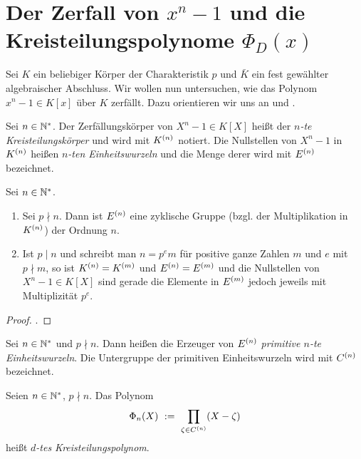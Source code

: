 \chapter{Der Zerfall von $x^n-1$ und die Kreisteilungspolynome $\Phi_D(x)$}
\label{chap:kreisteilungspolynome}

Sei $K$ ein beliebiger Körper der Charakteristik $p$ 
und $\bar K$ ein fest gewählter algebraischer
Abschluss. Wir wollen nun untersuchen, wie das Polynom
$x^n-1 \in K[x]$ über $K$ zerfällt. Dazu orientieren wir uns 
an \autocite{lidl1997finite} und \autocite{wan2003lectures}.

\begin{definition}
  Sei $n\in\mathbb{N}^\ast$. Der Zerfällungskörper von $X^n-1 \in K[X]$ heißt
  der \emph{$n$-te Kreisteilungskörper} und wird mit $K^{(n)}$ notiert.
  Die Nullstellen von $X^n-1$ in $K^{(n)}$ heißen \emph{$n$-ten
  Einheitswurzeln} und die Menge derer wird mit $E^{(n)}$ bezeichnet.
\end{definition}


\begin{satz}
  Sei $n\in \mathbb{N}^\ast$.
  \begin{enumerate}
    \item Sei $p\nmid n$. Dann ist $E^{(n)}$ eine zyklische Gruppe (bzgl. der
      Multiplikation in $K^{(n)}$) der Ordnung $n$.
    \item Ist $p \mid n$ und schreibt man $n = p^e m$ 
      für positive ganze Zahlen $m$ und $e$ mit $p\nmid m$, so
      ist $K^{(n)} = K^{(m)}$ und $E^{(n)}= E^{(m)}$ und die Nullstellen von
      $X^n-1 \in K[X]$ sind gerade die Elemente in $E^{(m)}$ jedoch jeweils mit
      Multiplizität $p^e$.
  \end{enumerate}
\end{satz}
\begin{proof}
  \autocite[Theorem 2.42]{lidl1997finite}.
\end{proof}


\begin{definition}
  Sei $n\in \mathbb{N}^\ast$ und $p\nmid n$. Dann heißen die Erzeuger von 
  $E^{(n)}$ \emph{primitive $n$-te Einheitswurzeln}. 
  Die Untergruppe der primitiven Einheitswurzeln wird mit
  $C^{(n)}$ bezeichnet.
\end{definition}


\begin{definition}[Kreisteilungspolynom]
  Seien $n \in \mathbb{N}^\ast$, $p\nmid n$. Das Polynom 
  \[ \Phi_n(X) \ :=\  \prod_{\zeta \in C^{(n)}} (X - \zeta)\]
  heißt \emph{$d$-tes Kreisteilungspolynom}.
\end{definition}

